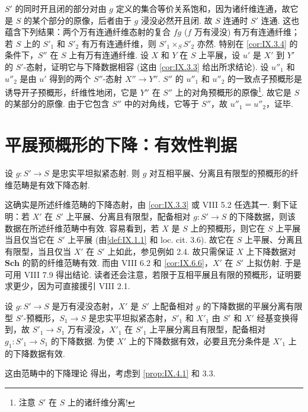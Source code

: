 $S'$ 的同时开且闭的部分对由 $g$ 定义的集合等价关系饱和，因为诸纤维连通，故它是 $S$ 的某个部分的原像，后者由于 $g$ 浸没必然开且闭. 故 $S$ 连通时 $S'$ 连通. 这也蕴含下列结果：两个万有连通纤维态射的复合 $fg$ ($f$ 万有浸没) 有万有连通纤维；若 $S$ 上的 $S'_1$ 和 $S'_2$ 有万有连通纤维，则 $S'_1 \times_S S'_2$ 亦然. 特别在 \ref{cor:IX.3.4} 的条件下，$S''$ 在 $S$ 上有万有连通纤维. 设 $X$ 和 $Y$ 在 $S$ 上平展，设 $u'$ 是 $X'$ 到 $Y'$ 的 $S'$-态射，证明它与下降数据相容 (这由 \ref{cor:IX.3.3} 给出所求结论). 设 $u''_1$ 和 $u''_2$ 是由 $u'$ 得到的两个 $S''$-态射 $X'' \to Y''$. $S''$ 的 $u''_1$ 和 $u''_2$ 的一致点子预概形是诱导开子预概形，纤维性地闭，它是 $Y''$ 在 $S''$ 上的对角预概形的原像\footnote{注意 $S'$ 在 $S$ 上的诸纤维分离!}. 故它是 $S$ 的某部分的原像. 由于它包含 $S''$ 中的对角线，它等于 $S''$，故 $u''_1 = u''_2$，证毕.

\section{平展预概形的下降：有效性判据}

\begin{proposition}\label{prop:IX.4.1}
设 $g \colon S' \to S$ 是忠实平坦拟紧态射. 则 $g$ 对互相平展、分离且有限型的预概形的纤维范畴是有效下降态射.
\end{proposition}

这确实是所述纤维范畴的下降态射，由 \ref{cor:IX.3.3} 或 VIII 5.2 任选其一. 剩下证明：若 $X'$ 在 $S'$ 上平展、分离且有限型，配备相对 $g \colon S' \to S$ 的下降数据，则该数据在所述纤维范畴中有效. 容易看到，若 $X$ 是 $S$ 上的预概形，则它在 $S$ 上平展当且仅当它在 $S'$ 上平展 (由\cref{def:IX.1.1} 和 loc. cit. 3.6). 故它在 $S$ 上平展、分离且有限型，当且仅当 $X'$ 在 $S'$ 上如此，参见例如 2.4. 故只需保证 $X$ 上下降数据对 $\mathbf{Sch}$ 的箭的纤维范畴有效. 而由 VIII 6.2 和 \ref{cor:IX.6.6}，$X'$ 在 $S'$ 上拟仿射. 于是可用 VIII 7.9 得出结论. 读者还会注意，若限于互相平展且有限的预概形，证明要求更少，因为可直接援引 VIII 2.1.

\begin{corollary}\label{cor:IX.4.2}
设 $g \colon S' \to S$ 是万有浸没态射，$X'$ 是 $S'$ 上配备相对 $g$ 的下降数据的平展分离有限型 $S'$-预概形，$S_1 \to S$ 是忠实平坦拟紧态射，$S'_1$ 和 $X'_1$ 由 $S'$ 和 $X'$ 经基变换得到，故 $S'_1 \to S_1$ 万有浸没，$X'_1$ 在 $S'_1$ 上平展分离且有限型，配备相对 $g_1 \colon S'_1 \to S_1$ 的下降数据. 为使 $X'$ 上的下降数据有效，必要且充分条件是 $X'_1$ 上的下降数据有效.
\end{corollary}

这由范畴中的下降理论 \cite{exp09-D} 得出，考虑到 \ref{prop:IX.4.1} 和 3.3.

